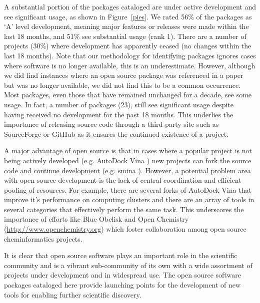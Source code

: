 A substantial portion of the packages cataloged are under active development and see significant usage, as shown in Figure~\ref{pies}.  We rated 56\% of the packages as `A' level development, meaning major features or releases were made within the last 18 months, and 51\% see substantial usage (rank 1).  
There are a number of projects (30\%) where development has apparently ceased (no changes within the last 18 months). Note that our methodology for identifying packages 
ignores cases where software is no longer available, this is an underestimate.
 However, although we did find instances where an open source package was referenced in a paper but was no longer available, we did not find this to be a common occurrence.  Most packages, even those that have remained unchanged for a decade, see some usage.  In fact, a number of packages (23), still see significant usage despite having received no development for the past 18 months.  This underlies the importance of releasing source code through a third-party site such as SourceForge or GitHub as it ensures the continued existence of a project.  
 
 A major advantage of open source is that in cases where a popular project is not being actively developed (e.g. AutoDock Vina \cite{Trott_2009}) new projects can fork the source code and continue development (e.g. smina \cite{Koes_2013}).  However, a potential problem area with open source development is the lack of central coordination and efficient pooling of resources.  For example, there are several forks of AutoDock Vina that improve it's performance on computing clusters and there are an array of tools in several categories that effectively perform the same task.  This underscores the importance of efforts like Blue Obelisk \cite{Guha_2006,blueobelisk} and Open Chemistry (\url{http://www.openchemistry.org}) which foster collaboration among open source cheminformatics projects.

It is clear that open source software plays an important role in the scientific community and is a vibrant sub-community of its own with a wide assortment of projects under development and in widespread use.  The open source software packages cataloged here provide launching points for the development of new tools for enabling further scientific discovery.
